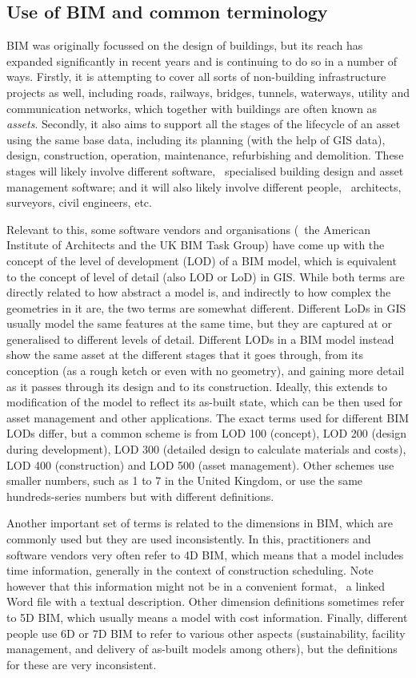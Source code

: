 \subsection{Use of BIM and common terminology}

BIM was originally focussed on the design of buildings, but its reach has expanded significantly in recent years and is continuing to do so in a number of ways.
Firstly, it is attempting to cover all sorts of non-building infrastructure projects as well, including roads, railways, bridges, tunnels, waterways, utility and communication networks, which together with buildings are often known as \emph{assets}.
Secondly, it also aims to support all the stages of the lifecycle of an asset using the same base data, including its planning (with the help of GIS data), design, construction, operation, maintenance, refurbishing and demolition.
These stages will likely involve different software, \eg\ specialised building design and asset management software; and it will also likely involve different people, \eg\ architects, surveyors, civil engineers, etc.

Relevant to this, some software vendors and organisations (\eg\ the American Institute of Architects and the UK BIM Task Group) have come up with the concept of the level of development (LOD) of a BIM model, which is equivalent to the concept of level of detail (also LOD or LoD) in GIS\@.
While both terms are directly related to how abstract a model is, and indirectly to how complex the geometries in it are, the two terms are somewhat different.
Different LoDs in GIS usually model the same features at the same time, but they are captured at or generalised to different levels of detail.
Different LODs in a BIM model instead show the same asset at the different stages that it goes through, from its conception (as a rough ketch or even with no geometry), and gaining more detail as it passes through its design and to its construction.
Ideally, this extends to modification of the model to reflect its as-built state, which can be then used for asset management and other applications.
The exact terms used for different BIM LODs differ, but a common scheme is from LOD 100 (concept), LOD 200 (design during development), LOD 300 (detailed design to calculate materials and costs), LOD 400 (construction) and LOD 500 (asset management).
Other schemes use smaller numbers, such as 1 to 7 in the United Kingdom, or use the same hundreds-series numbers but with different definitions.

Another important set of terms is related to the dimensions in BIM, which are commonly used but they are used inconsistently\@.
In this, practitioners and software vendors very often refer to 4D BIM, which means that a model includes time information, generally in the context of construction scheduling.
Note however that this information might not be in a convenient format, \eg\ a linked Word file with a textual description.
Other dimension definitions sometimes refer to 5D BIM, which usually means a model with cost information.
Finally, different people use 6D or 7D BIM to refer to various other aspects (sustainability, facility management, and delivery of as-built models among others), but the definitions for these are very inconsistent.

